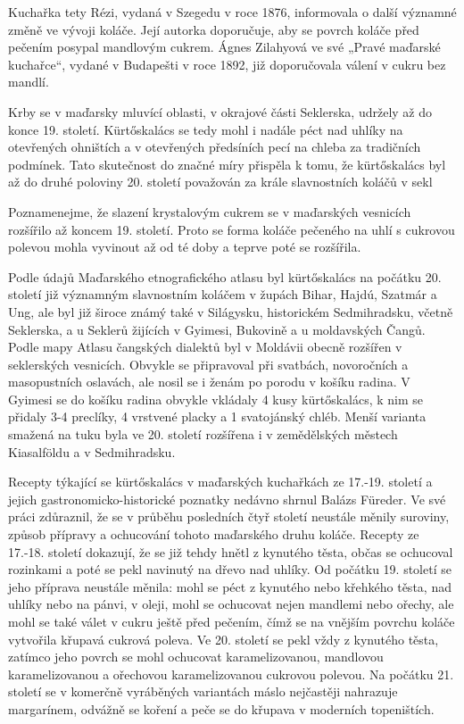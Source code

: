 Kuchařka tety Rézi, vydaná v Szegedu v roce 1876, informovala o další
významné změně ve vývoji koláče. Její autorka doporučuje, aby se povrch
koláče před pečením posypal mandlovým cukrem. Ágnes Zilahyová ve své
„Pravé maďarské kuchařce``, vydané v Budapešti v roce 1892, již
doporučovala válení v cukru bez mandlí.

Krby se v maďarsky mluvící oblasti, v okrajové části Seklerska, udržely
až do konce 19. století. Kürtőskalács se tedy mohl i nadále péct nad
uhlíky na otevřených ohništích a v otevřených předsíních pecí na chleba
za tradičních podmínek. Tato skutečnost do značné míry přispěla k tomu,
že kürtőskalács byl až do druhé poloviny 20. století považován za krále
slavnostních koláčů v sekl

Poznamenejme, že slazení krystalovým cukrem se v maďarských vesnicích
rozšířilo až koncem 19. století. Proto se forma koláče pečeného na uhlí
s cukrovou polevou mohla vyvinout až od té doby a teprve poté se
rozšířila.

Podle údajů Maďarského etnografického atlasu byl kürtőskalács na počátku
20. století již významným slavnostním koláčem v župách Bihar, Hajdú,
Szatmár a Ung, ale byl již široce známý také v Silágysku, historickém
Sedmihradsku, včetně Seklerska, a u Seklerů žijících v Gyimesi, Bukovině
a u moldavských Čangů. Podle mapy Atlasu čangských dialektů byl v
Moldávii obecně rozšířen v seklerských vesnicích. Obvykle se připravoval
při svatbách, novoročních a masopustních oslavách, ale nosil se i ženám
po porodu v košíku radina. V Gyimesi se do košíku radina obvykle
vkládaly 4 kusy kürtőskalács, k nim se přidaly 3-4 preclíky, 4 vrstvené
placky a 1 svatojánský chléb. Menší varianta smažená na tuku byla ve 20.
století rozšířena i v zemědělských městech Kiasalföldu a v Sedmihradsku.

Recepty týkající se kürtőskalács v maďarských kuchařkách ze 17.-19.
století a jejich gastronomicko-historické poznatky nedávno shrnul Balázs
Füreder. Ve své práci zdůraznil, že se v průběhu posledních čtyř století
neustále měnily suroviny, způsob přípravy a ochucování tohoto maďarského
druhu koláče. Recepty ze 17.-18. století dokazují, že se již tehdy hnětl
z kynutého těsta, občas se ochucoval rozinkami a poté se pekl navinutý
na dřevo nad uhlíky. Od počátku 19. století se jeho příprava neustále
měnila: mohl se péct z kynutého nebo křehkého těsta, nad uhlíky nebo na
pánvi, v oleji, mohl se ochucovat nejen mandlemi nebo ořechy, ale mohl
se také válet v cukru ještě před pečením, čímž se na vnějším povrchu
koláče vytvořila křupavá cukrová poleva. Ve 20. století se pekl vždy z
kynutého těsta, zatímco jeho povrch se mohl ochucovat karamelizovanou,
mandlovou karamelizovanou a ořechovou karamelizovanou cukrovou polevou.
Na počátku 21. století se v komerčně vyráběných variantách máslo
nejčastěji nahrazuje margarínem, odvážně se koření a peče se do křupava
v moderních topeništích.

